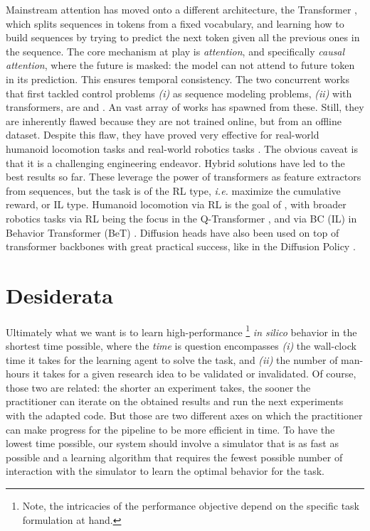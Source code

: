 \documentclass[12pt,a4paper]{article}
\begin{document}
Mainstream attention has moved onto a different architecture,
the Transformer \cite{Vaswani2017-lk},
which splits sequences in tokens from a fixed vocabulary,
and learning how to build sequences by trying to predict the next token given all the previous
ones in the sequence.
The core mechanism at play is \emph{attention}, and specifically \emph{causal attention}, where
the future is masked: the model can not attend to future token in its prediction.
This ensures temporal consistency.
The two concurrent works that first tackled control problems
\textit{(i)} as sequence modeling problems,
\textit{(ii)} with transformers, are
\cite{Chen2021-qq} and \cite{Janner2021-wn}.
An vast array of works has spawned from these.
Still, they are inherently flawed because they are not trained online, but from an offline dataset.
Despite this flaw, they have proved very effective for real-world humanoid locomotion tasks
\cite{Radosavovic2024-xl}
and real-world robotics tasks \cite{Brohan2022-vs, Brohan2023-rm}.
The obvious caveat is that it is a challenging engineering endeavor.
Hybrid solutions have led to the best results so far.
These leverage the power of transformers as feature extractors from sequences, but the task is of
the RL type, \textit{i.e.} maximize the cumulative reward, or IL type.
Humanoid locomotion via RL is the goal of \cite{Radosavovic2024-dm},
with broader robotics tasks via RL being the focus in the Q-Transformer \cite{Chebotar2023-hq},
and via BC (IL) in Behavior Transformer (BeT) \cite{Shafiullah2022-ux}.
Diffusion heads have also been used on top of transformer backbones with great practical success,
like in the Diffusion Policy \cite{Chi2023-is}.

\section{Desiderata}
\label{s:desiderata}

Ultimately what we want is to learn high-performance \footnote{Note, the intricacies of the
performance objective depend on the specific task formulation at hand.}
\textit{in silico} behavior in the shortest
time possible, where the \textit{time} is question encompasses
\textit{(i)} the wall-clock time it takes for the learning agent to solve the task, and
\textit{(ii)} the number of man-hours it takes for a given research idea to be validated
or invalidated.
Of course, those two are related: the shorter an experiment takes, the sooner the practitioner can
iterate on the obtained results and run the next experiments with the adapted code.
But those are two different axes on which the practitioner can make progress for the pipeline to
be more efficient in time.
To have the lowest time possible, our system should involve a simulator that is as fast as possible
and a learning algorithm that requires the fewest possible number of interaction with the simulator
to learn the optimal behavior for the task.
\end{document}
